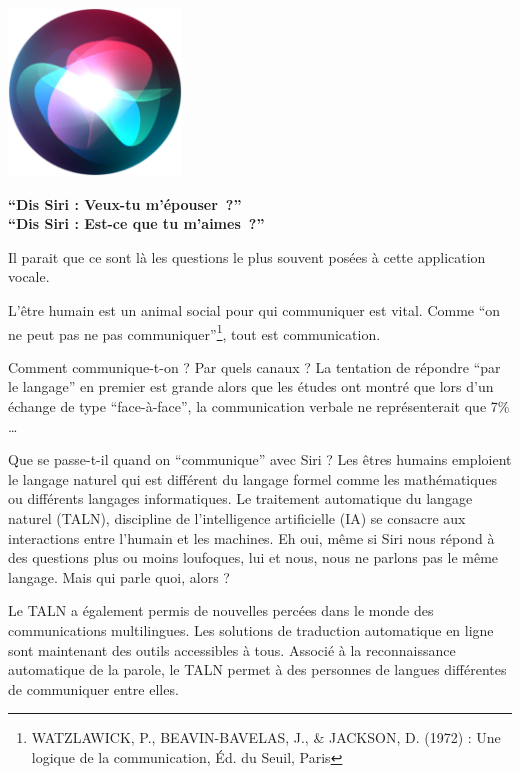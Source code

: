 \documentclass[
  10pt,
  french,
  a5paper,
  openany]{book}
\begin{document}
\begin{center}
\includegraphics[width=\textwidth,height=12em]{images/les-machines-et-la-communication.jpg}

\end{center}

\begin{center}
\textbf{``Dis Siri : Veux-tu m'épouser~?''}\\
\textbf{``Dis Siri : Est-ce que tu m'aimes~?''}

\end{center}

Il parait que ce sont là les questions le plus souvent posées à cette application vocale.

L'être humain est un animal social pour qui communiquer est vital. Comme ``on ne peut pas ne pas
communiquer''\footnote{WATZLAWICK, P., BEAVIN-BAVELAS, J., \& JACKSON, D. (1972) : Une logique de la communication, Éd. du Seuil, Paris}, tout est communication.

Comment communique-t-on ? Par quels canaux ? La tentation de répondre ``par le langage'' en premier est grande alors que les études ont montré que lors d'un échange de type ``face-à-face'', la communication verbale ne représenterait que 7\% \ldots{}

Que se passe-t-il quand on ``communique'' avec Siri ? Les êtres humains emploient le langage naturel qui est différent du langage formel comme les mathématiques ou différents langages informatiques. Le traitement automatique du langage naturel (TALN), discipline de l'intelligence artificielle (IA) se consacre aux interactions entre l'humain et les machines. Eh oui, même si Siri nous répond à des questions plus ou moins loufoques, lui et nous, nous ne parlons pas le même langage. Mais qui parle quoi, alors ?

Le TALN a également permis de nouvelles percées dans le monde des communications multilingues. Les solutions de traduction automatique en ligne sont maintenant des outils accessibles à tous. Associé à la reconnaissance automatique de la parole, le TALN permet à des personnes de langues différentes de communiquer entre elles.
\end{document}
